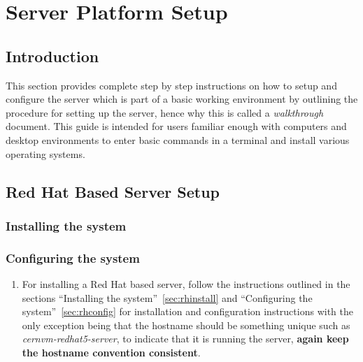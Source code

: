 \chapter{\cernvmreleasetesting Server Platform Setup}
\label{sec:serversetup}

\section{Introduction}
This section provides complete step by step instructions on how to setup and configure the \tapper server which is part of a basic 
working \releasetesting environment by outlining the procedure for setting up the server, hence why this is called a \emph{walkthrough} 
document. This guide is intended for users familiar enough with computers and desktop environments to enter basic commands in a terminal 
and install various operating systems. 




\newpage
\section{Red Hat Based Server Setup}
\subsection{Installing the system}
\subsection{Configuring the system}
\flushleft
\begin{enumerate}
\item 	For installing a Red Hat based server, follow the instructions outlined in the sections ``Installing the 
		system''~\ref{sec:rhinstall} and ``Configuring the system''~\ref{sec:rhconfig} for installation and configuration 
		instructions with the only exception being that the hostname should be something unique such as \emph{cernvm-redhat5-server}, to 
		indicate that it is running the \tapper server, {\bf again keep the hostname convention consistent}.
\end{enumerate}


\newpage
